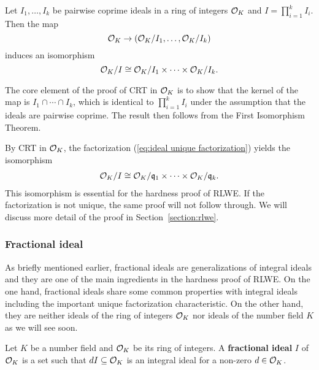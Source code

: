 \documentclass[../main.tex]{subfiles}
\begin{document}
\begin{theorem}
\label{thm:crtInOK}
\reversemarginpar
{}
   Let $I_1, \dots, I_k$ be pairwise coprime ideals in a ring of integers $\mathcal{O}_K$ and $I = \prod_{i=1}^k I_i$. Then the map 
   \begin{equation*}
       \mathcal{O}_K \rightarrow (\mathcal{O}_K / I_1, \dots, \mathcal{O}_K/I_k)
   \end{equation*}
   induces an isomorphism 
   \begin{equation*}
       \mathcal{O}_K / I \cong \mathcal{O}_K / I_1 \times \cdots \times \mathcal{O}_K / I_k.
   \end{equation*}
\end{theorem}

The core element of the proof of CRT in $\mathcal{O}_K$ %
is to show that the kernel of the map is $I_1 \cap \cdots \cap I_k$, which is identical to $\prod_{i=1}^k I_i$ under the assumption that the ideals are pairwise coprime. The result then  follows from the First Isomorphism Theorem. 

By CRT in $\mathcal{O}_K$, the factorization (\ref{eq:ideal unique factorization}) yields the isomorphism 
\begin{align}\label{eq:ok prime ideal crt}
    \mathcal{O}_K/I \cong \mathcal{O}_K / \mathfrak{q}_1 \times \cdots \times \mathcal{O}_K / \mathfrak{q}_k. 
\end{align}
This isomorphism is essential for the hardness proof of RLWE. %
If the factorization is not unique, the same proof will not follow through. We will discuss more detail of the proof in Section~\ref{section:rlwe}. 


\subsubsection{Fractional ideal}
As briefly mentioned earlier, fractional ideals are generalizations of integral ideals and they are one of the main ingredients in the hardness proof of RLWE.
On the one hand, fractional ideals share some common properties with integral ideals including the important unique factorization characteristic. On the other hand, they are neither ideals of the ring of integers $\mathcal{O}_K$ nor ideals of the number field $K$ as we will see soon. 

\begin{definition}
\label{def:fracIdeal2}
Let $K$ be a number field and $\mathcal{O}_K$ be its ring of integers. A \textbf{fractional ideal}\reversemarginpar
{}
 $I$ of $\mathcal{O}_K$ is a set such that $dI \subseteq \mathcal{O}_K$ is an integral ideal for a non-zero $d \in \mathcal{O}_K$.  
\end{definition}
\end{document}
